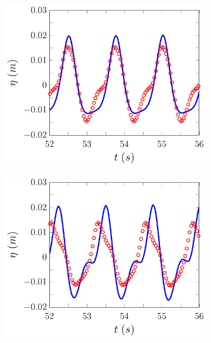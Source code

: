 \begin{figure}
	\centering
	\begin{subfigure}{0.5\textwidth}
		\includegraphics[width=\textwidth]{./chp6/figures/Experiment/Beji/sh/FDVMWG5.pdf}
		\vspace{0.5cm}
	\end{subfigure}%
	\begin{subfigure}{0.5\textwidth}
		\includegraphics[width=\textwidth]{./chp6/figures/Experiment/Beji/sh/FDVMWG6.pdf}
		\vspace{0.5cm}
	\end{subfigure}

\end{figure}
